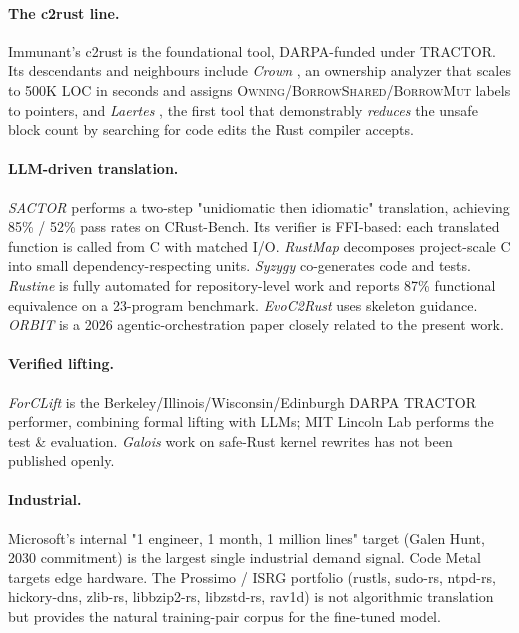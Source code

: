 \documentclass[12pt]{article}
\theoremstyle{definition}
\theoremstyle{remark}
\begin{document}
\paragraph{The c2rust line.} Immunant's c2rust \cite{immunant2025} is
the foundational tool, DARPA-funded under TRACTOR. Its descendants and
neighbours include \emph{Crown} \cite{komaec2023crown}, an ownership
analyzer that scales to 500K LOC in seconds and assigns
\textsc{Owning}/\textsc{BorrowShared}/\textsc{BorrowMut} labels to
pointers, and \emph{Laertes} \cite{emre2023laertes}, the first tool
that demonstrably \emph{reduces} the unsafe block count by searching
for code edits the Rust compiler accepts.

\paragraph{LLM-driven translation.} \emph{SACTOR}
\cite{sactor2025} performs a two-step "unidiomatic then idiomatic"
translation, achieving 85\% / 52\% pass rates on CRust-Bench. Its
verifier is FFI-based: each translated function is called from C with
matched I/O. \emph{RustMap} \cite{rustmap2025} decomposes
project-scale C into small dependency-respecting units. \emph{Syzygy}
\cite{syzygy2024} co-generates code and tests. \emph{Rustine}
\cite{rustine2025} is fully automated for repository-level work and
reports 87\% functional equivalence on a 23-program benchmark.
\emph{EvoC2Rust} \cite{evoc2rust2025} uses skeleton guidance.
\emph{ORBIT} \cite{orbit2026} is a 2026 agentic-orchestration paper
closely related to the present work.

\paragraph{Verified lifting.} \emph{ForCLift}
\cite{forclift2024} is the Berkeley/Illinois/Wisconsin/Edinburgh
DARPA TRACTOR performer, combining formal lifting with LLMs;
MIT Lincoln Lab performs the test \& evaluation. \emph{Galois}
work on safe-Rust kernel rewrites has not been published openly.

\paragraph{Industrial.} Microsoft's internal "1 engineer, 1 month, 1
million lines" target (Galen Hunt, 2030 commitment) is the largest
single industrial demand signal. Code Metal targets edge hardware.
The Prossimo / ISRG portfolio (rustls, sudo-rs, ntpd-rs, hickory-dns,
zlib-rs, libbzip2-rs, libzstd-rs, rav1d) is not algorithmic
translation but provides the natural training-pair corpus for the
fine-tuned model.
\end{document}
